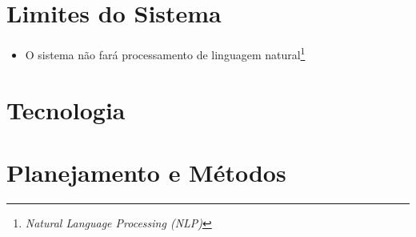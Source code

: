 \section{Limites do Sistema}

\begin{itemize}
    \item O sistema não fará processamento de linguagem natural\footnote{\textit{Natural Language Processing (NLP)}}

\end{itemize}

\section{Tecnologia} %
\label{sec:tecnologia}


\section{Planejamento e Métodos} %
\label{sec:planejamento_e_métodos}



